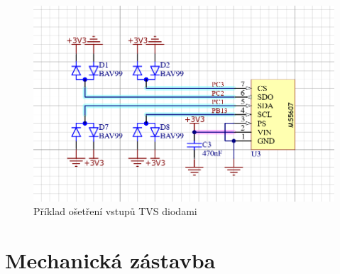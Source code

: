 \documentclass[twoside]{ctuthesis}
\theoremstyle{plain}
\theoremstyle{definition}
\theoremstyle{note}
\begin{document}
			\begin{figure}
				\centering
				\includegraphics[width = .7\textwidth]{Figures/osetreni_vstupu.png}
				\caption{Příklad ošetření vstupů TVS diodami}
				\label{fig:osetreni:vstupu}
			\end{figure}




	\section{Mechanická zástavba}
\end{document}
